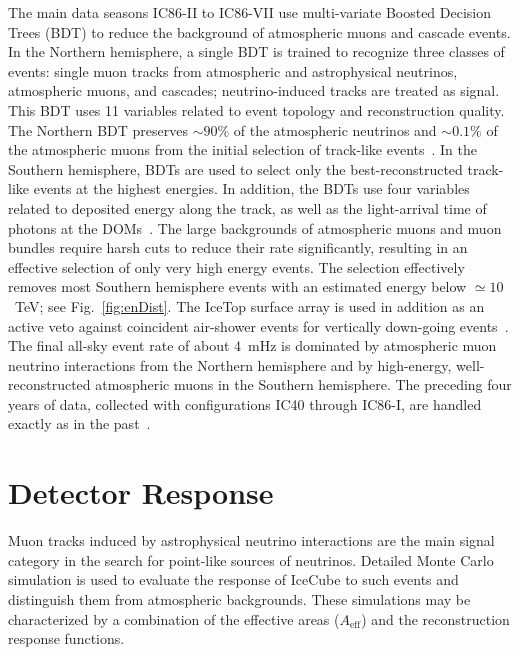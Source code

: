 \documentclass[aps,10pt,prd,twocolumn,floats,letterpaper,showpacs,nofootinbib,bibnotes,notitlepage,superscriptaddress,floatfix]{revtex4-1}
\newcommand{\MA}[1]{{\color{black}#1}}
\begin{document}
The main data seasons IC86-II to IC86-VII use multi-variate Boosted Decision Trees (BDT) to reduce the background of atmospheric muons and cascade events. In the Northern hemisphere, a single BDT is trained to recognize three classes of events: single muon tracks from atmospheric and astrophysical neutrinos, atmospheric muons, and cascades; neutrino-induced tracks are treated as signal. This BDT uses 11 variables related to event topology and reconstruction quality. The Northern BDT preserves $\sim90\%$ of the atmospheric neutrinos and $\sim0.1\%$ of the atmospheric muons from the initial selection of track-like events~\cite{Aartsen:2016oji,Aartsen:2018ywr,Aartsen:2019fau}. In the Southern hemisphere, BDTs are used to select only the best-reconstructed track-like events at the highest energies. In addition, the BDTs use four variables related to deposited energy along the track, as well as the light-arrival time of photons at the DOMs~\cite{Aartsen:2014cva,Aartsen:2016oji}. The large backgrounds of atmospheric muons and muon bundles require harsh cuts to reduce their rate significantly, resulting in an effective selection of only very high energy events. The selection effectively removes most Southern hemisphere events with an estimated energy below $\simeq10$~TeV; see Fig.~\ref{fig:enDist}. The IceTop surface array is used in addition as an active veto against coincident air-shower events for vertically down-going events~\cite{Aartsen:2013uuv}. The final all-sky event rate of about $4$~mHz is dominated by atmospheric muon neutrino interactions from the Northern hemisphere and by high-energy, well-reconstructed atmospheric muons in the Southern hemisphere. The preceding four years of data, collected with configurations IC40 through IC86-I, are handled exactly as in the past~\cite{Abbasi:2010rd,Aartsen:2013uuv,Schatto:2014kbj,Aartsen:2014cva}.



\section{Detector Response}\label{secIII}

Muon tracks induced by astrophysical neutrino interactions are the main signal category in the search for point-like sources of neutrinos. Detailed Monte Carlo simulation is used to evaluate the response of IceCube to such events and distinguish them from atmospheric backgrounds. These simulations may be characterized by a combination of the effective areas ($A_\mathrm{eff}$) and the reconstruction response functions. 
\end{document}
